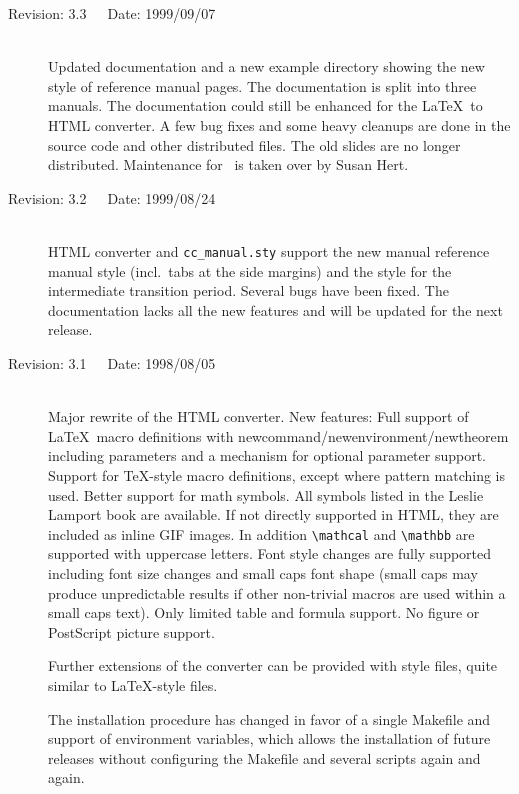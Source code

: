 \documentclass[11pt]{article}
\begin{document}
\begin{description}
    \item[Revision: 3.3~~~Date: 1999/09/07]~\\[3mm]
    Updated documentation and a new example directory showing the new
    style of reference manual pages. The documentation is split into
    three manuals. The documentation could still be enhanced for the 
    \LaTeX\ to HTML converter. A few bug fixes and some heavy cleanups 
    are done in the source code and other distributed files. The old
    slides are no longer distributed. Maintenance for \cgal\ is taken
    over by Susan Hert.

    \item[Revision: 3.2~~~Date: 1999/08/24]~\\[3mm]
    HTML converter and \verb+cc_manual.sty+ support the new manual 
    reference manual style (incl.~tabs at the side margins) and
    the style for the intermediate transition period. Several bugs 
    have been fixed. The documentation lacks all the new features 
    and will be updated for the next release.

    \item[Revision: 3.1~~~Date: 1998/08/05]~\\[3mm]
    Major rewrite of the HTML converter. New features: Full support of
    \LaTeX\ macro definitions with newcommand/newenvironment/newtheorem
    including parameters and a mechanism for optional parameter support.
    Support for \TeX-style macro definitions, except where pattern
    matching is used. Better support for math symbols. All symbols listed
    in the Leslie Lamport book are available. If not directly supported in
    HTML, they are included as inline GIF images. In addition
    \verb+\mathcal+ and \verb+\mathbb+ are supported with uppercase letters.
    Font style changes are fully supported including font size changes and
    small caps font shape (small caps may produce unpredictable results 
    if other non-trivial macros are used within a small caps text).
    Only limited table and formula support. No figure or PostScript
    picture support.

    Further extensions of the converter can be provided with style files,
    quite similar to \LaTeX-style files.

    The installation procedure has changed in favor of a single Makefile and
    support of environment variables, which allows the installation of future
    releases without configuring the Makefile and several scripts again and
    again.



\end{description}
\end{document}
